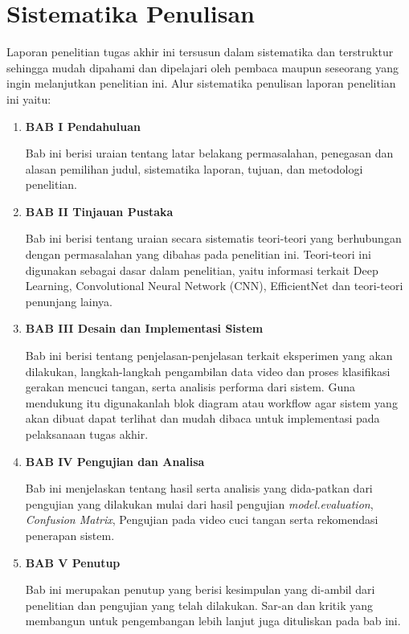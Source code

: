 \newpage
\section{Sistematika Penulisan}
\label{sec:sistematikapenulisan}

Laporan penelitian tugas akhir ini tersusun dalam sistematika dan terstruktur sehingga mudah dipahami dan dipelajari oleh pembaca maupun seseorang yang ingin melanjutkan penelitian ini. Alur sistematika penulisan laporan penelitian ini yaitu:

\begin{enumerate}[nolistsep]

  \item \textbf{BAB I Pendahuluan}

  Bab ini berisi uraian tentang latar belakang permasalahan, penegasan dan alasan pemilihan judul, sistematika laporan, tujuan, dan metodologi penelitian.
  
  \vspace{2ex}

  \item \textbf{BAB II Tinjauan Pustaka}

  Bab ini berisi tentang uraian secara sistematis teori-teori yang berhubungan dengan permasalahan yang dibahas pada penelitian ini. Teori-teori ini digunakan sebagai dasar dalam penelitian, yaitu informasi terkait Deep Learning, Convolutional Neural Network (CNN), EfficientNet dan teori-teori penunjang lainya.

  \vspace{2ex}

  \item \textbf{BAB III Desain dan Implementasi Sistem}

  Bab ini berisi tentang penjelasan-penjelasan terkait eksperimen yang akan dilakukan, langkah-langkah pengambilan data video dan proses klasifikasi gerakan mencuci tangan, serta analisis performa dari sistem. Guna mendukung itu digunakanlah blok diagram atau workﬂow agar sistem yang akan dibuat dapat terlihat dan mudah dibaca untuk implementasi pada pelaksanaan tugas akhir.

  \vspace{2ex}

  \item \textbf{BAB IV Pengujian dan Analisa}

  Bab ini menjelaskan tentang hasil serta analisis yang dida-patkan dari pengujian yang dilakukan mulai dari hasil pengujian \emph{model.evaluation}, \emph{Confusion Matrix}, Pengujian pada video cuci tangan serta rekomendasi penerapan sistem.

  \vspace{2ex}

  \item \textbf{BAB V Penutup}

  Bab ini merupakan penutup yang berisi kesimpulan yang di-ambil dari penelitian dan pengujian yang telah dilakukan. Sar-an dan kritik yang membangun untuk pengembangan lebih lanjut juga dituliskan pada bab ini.

\end{enumerate}
